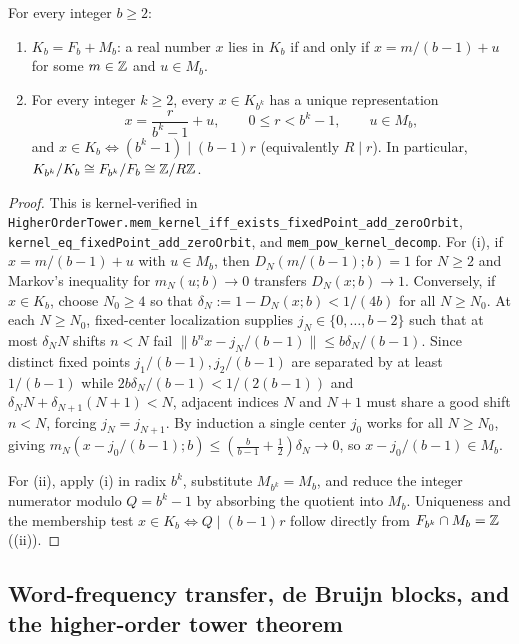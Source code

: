 \documentclass[11pt]{article}
\newcommand{\dist}[1]{\lVert #1\rVert}
\newcommand{\ttt}[1]{\texttt{#1}}
\begin{document}
\begin{theorem}\label{thm:kernel-decomp}
For every integer $b\ge2$:
\begin{enumerate}[label=\textup{(\roman*)},nosep]
\item $K_b=F_b+M_b$: a real number $x$ lies in $K_b$ if and only if $x=m/(b-1)+u$ for some $m\in\mathbb Z$ and $u\in M_b$.
\item For every integer $k\ge2$, every $x\in K_{b^k}$ has a unique representation
\begin{equation}\label{eq:tower-decomp}
x=\frac{r}{b^k-1}+u,\qquad 0\le r<b^k-1,\qquad u\in M_b,
\end{equation}
and $x\in K_b\iff (b^k-1)\mid(b-1)r$ (equivalently $R\mid r$). In particular, $K_{b^k}/K_b\cong F_{b^k}/F_b\cong\mathbb Z/R\mathbb Z$.
\end{enumerate}
\end{theorem}

\begin{proof}
This is kernel-verified in \ttt{HigherOrderTower.mem\_kernel\_iff\_exists\_fixedPoint\_add\_zeroOrbit}, \ttt{kernel\_eq\_fixedPoint\_add\_zeroOrbit}, and \ttt{mem\_pow\_kernel\_decomp}. For (i), if $x=m/(b-1)+u$ with $u\in M_b$, then $D_N(m/(b-1);b)=1$ for $N\ge2$ and Markov's inequality for $m_N(u;b)\to0$ transfers $D_N(x;b)\to1$. Conversely, if $x\in K_b$, choose $N_0\ge4$ so that $\delta_N:=1-D_N(x;b)<1/(4b)$ for all $N\ge N_0$. At each $N\ge N_0$, fixed-center localization supplies $j_N\in\{0,\dots,b-2\}$ such that at most $\delta_N N$ shifts $n<N$ fail $\dist{b^nx-j_N/(b-1)}\le b\delta_N/(b-1)$. Since distinct fixed points $j_1/(b-1),j_2/(b-1)$ are separated by at least $1/(b-1)$ while $2b\delta_N/(b-1)<1/(2(b-1))$ and $\delta_N N+\delta_{N+1}(N+1)<N$, adjacent indices $N$ and $N+1$ must share a good shift $n<N$, forcing $j_N=j_{N+1}$. By induction a single center $j_0$ works for all $N\ge N_0$, giving $m_N(x-j_0/(b-1);b)\le(\frac{b}{b-1}+\frac12)\delta_N\to0$, so $x-j_0/(b-1)\in M_b$.

For (ii), apply (i) in radix $b^k$, substitute $M_{b^k}=M_b$, and reduce the integer numerator modulo $Q=b^k-1$ by absorbing the quotient into $M_b$. Uniqueness and the membership test $x\in K_b\iff Q\mid(b-1)r$ follow directly from $F_{b^k}\cap M_b=\mathbb Z$ ((ii)).
\end{proof}

\subsection{Word-frequency transfer, de Bruijn blocks, and the higher-order tower theorem}
\end{document}
